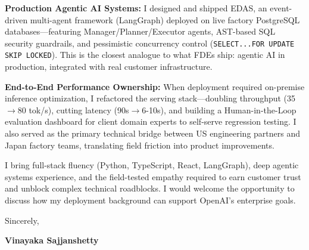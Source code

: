 \documentclass[letterpaper,11pt]{article}
\begin{document}
\textbf{Production Agentic AI Systems:} I designed and shipped EDAS, an event-driven multi-agent framework (LangGraph) deployed on live factory PostgreSQL databases---featuring Manager/Planner/Executor agents, AST-based SQL security guardrails, and pessimistic concurrency control (\texttt{SELECT...FOR UPDATE SKIP LOCKED}). This is the closest analogue to what FDEs ship: agentic AI in production, integrated with real customer infrastructure.

\vspace{6pt}

\textbf{End-to-End Performance Ownership:} When deployment required on-premise inference optimization, I refactored the serving stack---doubling throughput (35$\to$80 tok/s), cutting latency (90s$\to$6-10s), and building a Human-in-the-Loop evaluation dashboard for client domain experts to self-serve regression testing. I also served as the primary technical bridge between US engineering partners and Japan factory teams, translating field friction into product improvements.

\vspace{6pt}

I bring full-stack fluency (Python, TypeScript, React, LangGraph), deep agentic systems experience, and the field-tested empathy required to earn customer trust and unblock complex technical roadblocks. I would welcome the opportunity to discuss how my deployment background can support OpenAI's enterprise goals.

\vspace{20pt}

Sincerely,

\vspace{14pt}

\textbf{Vinayaka Sajjanshetty}
\end{document}
